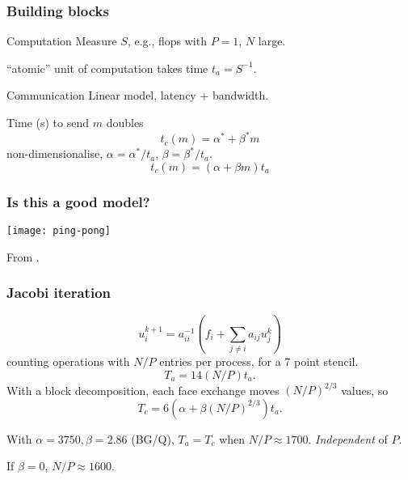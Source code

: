 \documentclass[presentation]{beamer}
\begin{document}
\begin{frame}
  \frametitle{Building blocks}
  \begin{block}{Computation}
    Measure $S$, e.g., flops with $P=1$, $N$ large.

    ``atomic'' unit of computation takes time $t_a = S^{-1}$.
  \end{block}

  \begin{block}{Communication}
    Linear model, latency + bandwidth.

    Time (s) to send $m$ doubles
    \begin{equation*}
      t_c(m) = \alpha^* + \beta^* m
    \end{equation*}
    non-dimensionalise, $\alpha = \alpha^*/t_a$, $\beta =
    \beta^*/t_a$.
    \begin{equation*}
      t_c(m) = (\alpha + \beta m)t_a
    \end{equation*}
  \end{block}
\end{frame}

\begin{frame}
  \frametitle{Is this a good model?}
  \begin{center}
    \texttt{[image: ping-pong]}
  \end{center}
  From \textcite{Fischer:2015}.

\end{frame}

\begin{frame}
  \frametitle{Jacobi iteration}
  \begin{equation*}
    u_i^{k+1} = a_{ii}^{-1}\left(f_i + \sum_{j \ne i} a_{ij}u_j^{k}\right)
  \end{equation*}
  counting operations with $N/P$ entries per process, for a 7 point stencil.
  \begin{equation*}
    T_a = 14(N/P)t_a.
  \end{equation*}
  With a block decomposition, each face exchange moves $(N/P)^{2/3}$
  values, so
  \begin{equation*}
    T_c = 6 \left(\alpha + \beta (N/P)^{2/3}\right)t_a.
  \end{equation*}

  With $\alpha = 3750, \beta = 2.86$ (BG/Q), $T_a = T_c$ when $N/P
  \approx 1700$.  \emph{Independent} of $P$.

  If $\beta = 0$, $N/P \approx 1600$.
\end{frame}
\end{document}
